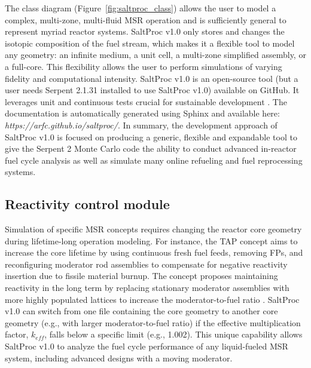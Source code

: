 The class diagram (Figure~\ref{fig:saltproc_class}) allows the user to model a 
complex, multi-zone, multi-fluid \gls{MSR} operation and is sufficiently 
general to represent myriad reactor systems. SaltProc v1.0 only stores and 
changes the isotopic composition of the fuel stream, which makes it a flexible 
tool to model any geometry: an infinite medium, a unit cell, a multi-zone 
simplified assembly, or a full-core. This flexibility allows the user to 
perform simulations of varying fidelity and computational intensity. 
SaltProc v1.0 is an open-source tool (but a user needs Serpent 2.1.31 
installed to use SaltProc v1.0) available on GitHub. It leverages unit and 
continuous tests crucial for sustainable development \cite{krekel_pytest_2004, 
travis_travis-ci/travis-api_2016}. The documentation is automatically 
generated using Sphinx \cite{brandl_sphinx_2009} and available here: 
\emph{https://arfc.github.io/saltproc/}. In summary, the development approach 
of SaltProc v1.0 is focused on producing a generic, flexible and expandable 
tool to give the Serpent 2 Monte Carlo code the ability to conduct advanced 
in-reactor fuel cycle analysis as well as simulate many online refueling and 
fuel reprocessing systems.

\subsection{Reactivity control module}
Simulation of specific \gls{MSR} concepts requires changing the reactor core 
geometry during lifetime-long operation modeling. For instance, the \gls{TAP} 
concept aims to increase the core lifetime by using continuous fresh fuel 
feeds, removing \glspl{FP}, and reconfiguring moderator rod assemblies to 
compensate for negative reactivity insertion due to fissile material burnup. 
The concept proposes maintaining reactivity in the long term by replacing 
stationary moderator assemblies with more highly populated lattices to 
increase the moderator-to-fuel ratio \cite{betzler_assessment_2017-1}. 
SaltProc v1.0 can switch from one file containing the core geometry to 
another core geometry (e.g., with larger moderator-to-fuel ratio) if the 
effective multiplication factor, $k_{eff}$, falls below a specific limit 
(e.g., 1.002). This unique capability allows SaltProc v1.0 to analyze the fuel 
cycle performance of any liquid-fueled \gls{MSR} system, including advanced 
designs with a moving moderator.

